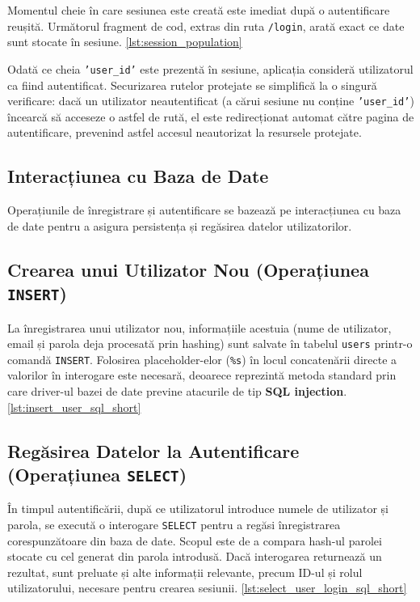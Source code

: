\documentclass[12pt, a4paper, oneside, romanian]{teza-upb}
\begin{document}
Momentul cheie în care sesiunea este creată este imediat după o autentificare reușită. Următorul fragment de cod, extras din ruta \texttt{/login}, arată exact ce date sunt stocate în sesiune. \ref{lst:session_population}



Odată ce cheia \texttt{'user\_id'} este prezentă în sesiune, aplicația consideră utilizatorul ca fiind autentificat. Securizarea rutelor protejate se simplifică la o singură verificare: dacă un utilizator neautentificat (a cărui sesiune nu conține \texttt{'user\_id'}) încearcă să acceseze o astfel de rută, el este redirecționat automat către pagina de autentificare, prevenind astfel accesul neautorizat la resursele protejate.

\subsection{Interacțiunea cu Baza de Date}
Operațiunile de înregistrare și autentificare se bazează pe interacțiunea cu baza de date pentru a asigura persistența și regăsirea datelor utilizatorilor.

\subsection*{Crearea unui Utilizator Nou (Operațiunea \texttt{INSERT})}
La înregistrarea unui utilizator nou, informațiile acestuia (nume de utilizator, email și parola deja procesată prin hashing) sunt salvate în tabelul \texttt{users} printr-o comandă \texttt{INSERT}. Folosirea placeholder-elor (\texttt{\%s}) în locul concatenării directe a valorilor în interogare este necesară, deoarece reprezintă metoda standard prin care driver-ul bazei de date previne atacurile de tip \textbf{SQL injection}. \ref{lst:insert_user_sql_short}


\subsection*{Regăsirea Datelor la Autentificare (Operațiunea \texttt{SELECT})}
În timpul autentificării, după ce utilizatorul introduce numele de utilizator și parola, se execută o interogare \texttt{SELECT} pentru a regăsi înregistrarea corespunzătoare din baza de date. Scopul este de a compara hash-ul parolei stocate cu cel generat din parola introdusă. Dacă interogarea returnează un rezultat, sunt preluate și alte informații relevante, precum ID-ul și rolul utilizatorului, necesare pentru crearea sesiunii. \ref{lst:select_user_login_sql_short}
\end{document}
